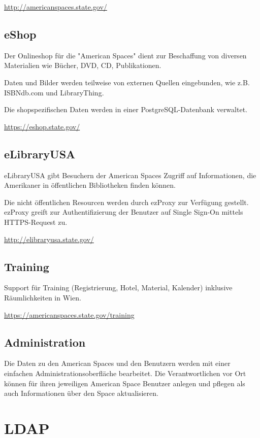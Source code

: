 \url{http://americanspaces.state.gov/}
    
\subsection{eShop}

Der Onlineshop für die "American Spaces" dient zur Beschaffung von
diversen Materialien wie Bücher, DVD, CD, Publikationen.

Daten und Bilder werden teilweise von externen Quellen eingebunden,
wie z.B. ISBNdb.com und LibraryThing.

Die shopspezifischen Daten werden in einer PostgreSQL-Datenbank
verwaltet.

\url{https://eshop.state.gov/}
    
\subsection{eLibraryUSA}

eLibraryUSA gibt Besuchern der American Spaces Zugriff
auf Informationen, die Amerikaner in öffentlichen
Bibliotheken finden können.
    
Die nicht öffentlichen Resourcen werden durch ezProxy zur
Verfügung gestellt. ezProxy greift zur Authentifizierung
der Benutzer auf Single Sign-On mittels HTTPS-Request zu.
    
\url{http://elibraryusa.state.gov/}

\subsection{Training}

Support für Training (Registrierung, Hotel, Material, Kalender)
inklusive Räumlichkeiten in Wien.

\url{https://americanspaces.state.gov/training}
    
\subsection{Administration}

Die Daten zu den American Spaces und den Benutzern werden
mit einer einfachen Administrationsoberfläche bearbeitet.
Die Verantwortlichen vor Ort können für ihren
jeweiligen American Space Benutzer anlegen und pflegen
als auch Informationen über den Space aktualisieren.

\section{LDAP}

